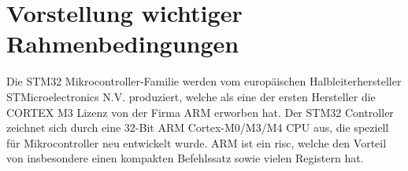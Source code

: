 \documentclass[a4paper,
DIV=13,
12pt,
BCOR=10mm,
department=FakIM,
oneside,
parskip=half,
automark,
listof=totocnumbered,
bibliography=totocnumbered,
acronym=totocnumbered
] {OTHRartcl}
\begin{document}
\section{Vorstellung wichtiger Rahmenbedingungen}

Die STM32 Mikrocontroller-Familie werden vom europäischen Halbleiterhersteller STMicroelectronics N.V. produziert, welche als eine der ersten Hersteller
die CORTEX M3 Lizenz von der Firma ARM erworben hat.
Der STM32 Controller zeichnet sich durch eine 32-Bit ARM Cortex-M0/M3/M4 CPU aus, die speziell für Mikrocontroller neu entwickelt wurde.
ARM ist ein \ac*{risc}, welche den Vorteil von insbesondere einen kompakten Befehlssatz sowie vielen Registern hat.
\end{document}
